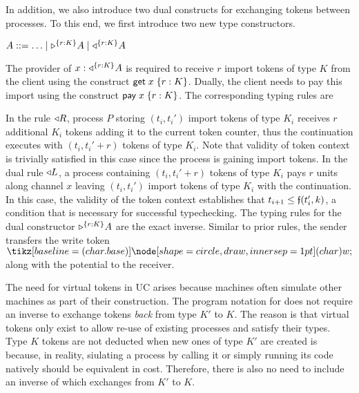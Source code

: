 In addition, we also introduce two dual constructs for exchanging tokens
between processes.
To this end, we first introduce two new type constructors.
\begin{center}
\begin{minipage}{0cm}
\begin{tabbing}
$A ::= \ldots \mid \tpaypot{A}{r : K} \mid \tgetpot{A}{r : K}$
\end{tabbing}
\end{minipage}
\end{center}
The provider of $x : \tgetpot{A}{r : K}$ is required to receive
$r$ import tokens of type $K$ from the client using the construct
$\eget{x}{r : K}$. Dually, the client needs to pay this import
using the construct $\epay{x}{r : K}$.
The corresponding typing rules are
In the rule $\getpot R$, process $P$ storing $(t_i, t_i')$ import tokens of type $K_i$
receives $r$ additional $K_i$ tokens adding it to the current token counter, thus
the continuation executes with $(t_i, t_i'+r)$ tokens of type $K_i$.
Note that validity of token context is trivially satisfied in this case since the
process is gaining import tokens.
%
In the dual rule $\getpot L$, a process containing $(t_i, t_i'+r)$ tokens of type $K_i$
pays $r$ units along channel $x$ leaving $(t_i, t_i')$ import tokens of type $K_i$ with
the continuation.
In this case, the validity of the token context establishes that $t_{i+1} \leq \GlobalF(t_i',k)$,
a condition that is necessary for successful typechecking.
The typing rules for the dual constructor $\tpaypot{A}{r : K}$
are the exact inverse.
Similar to prior rules, the sender transfers the write token $\wt$
along with the potential to the receiver.

The need for virtual tokens in UC arises because machines often simulate
other machines as part of their construction. The program notation for 
does not require an inverse to exchange tokens \textit{back} from type $K'$ to $K$.
The reason is that virtual tokens only exist to allow re-use of existing processes 
and satisfy their types. Type $K$ tokens are not deducted when new ones of type $K'$ 
are created is because, in reality, siulating a process by calling it or simply running
its code natively should be equivalent in cost. Therefore, there is also no need to 
include an inverse of  which exchanges from $K'$ to $K$.

